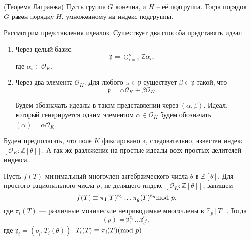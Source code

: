 \documentclass[_00_dissertation.tex]{subfiles}
\begin{document}
\begin{statement}\label{statement:lagrange}(Теорема Лагранжа)
    Пусть группа $G$ конечна, и $H$ -- её подгруппа.
    Тогда порядок $G$ равен порядку $H$, умноженному на индекс подгруппы.
\end{statement}


Рассмотрим представления идеалов.
Существует два способа представить идеал

\begin{enumerate}
    \item Через целый базис.
    \begin{equation}\label{eq:Z_basis}
        \mathfrak{p} = \oplus_{i=1}^{n} \mathbb{Z}\alpha_i,
    \end{equation}
    где $\alpha_i\in\mathcal{O}_K$.

    \item Через два элемента $\mathcal{O}_K$.
    Для любого $\alpha\in\mathfrak{p}$ существует $\beta\in\mathfrak{p}$ такой, что
    \begin{equation}\label{eq:2_element}
        \mathfrak{p} = \alpha\mathcal{O}_K + \beta\mathcal{O}_K.
    \end{equation}

    Будем обозначать идеалы в таком представлении через $(\alpha, \beta)$.
    Идеал, который генерируется одним элементом $\alpha\in\mathcal{O}_K$ будем обозначать $(\alpha) = \alpha\mathcal{O}_K$.
\end{enumerate}

Будем предполагать, что поле $K$ фиксировано и, следовательно, известен индекс $[\mathcal{O}_K:\mathbb{Z}[\theta]]$.
А так же разложение на простые идеалы всех простых делителей индекса.

\begin{statement}\label{statement:dedekind}
    Пусть $f(T)$ минимальный многочлен алгебраического числа $\theta$ в $\mathbb{Z}[\theta]$.
    Для простого рационального числа $p$, не делящего индекс $[\mathcal{O}_K:\mathbb{Z}[\theta]]$, запишем
    \begin{equation}
        f(T) \equiv \pi_1(T)^{e_1}\dots \pi_g(T)^{e_g} \textrm{mod } p,\nonumber
    \end{equation}
    где $\pi_i(T)$ --- различные монические неприводимые многочлены в $\mathbb{F}_p[T]$.
    Тогда
    \begin{equation}
        (p) = \mathfrak{p}_1^{e_1}\dots \mathfrak{p}_g^{e_g},\nonumber
    \end{equation}
    где $\mathfrak{p}_i = (p_i, T_i(\theta))$, $T_i(T) \equiv \pi_i(T)(\textrm{mod } p)$.
\end{statement}
\end{document}
